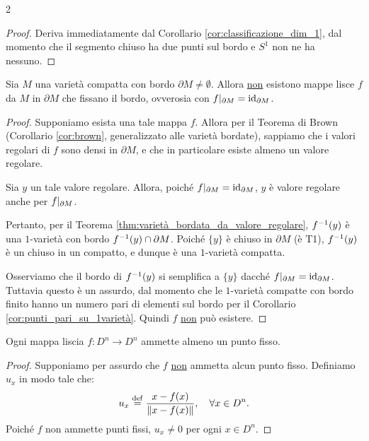 \begin{multicols*}{2}
    \begin{proof}
        Deriva immediatamente dal Corollario \ref{cor:classificazione_dim_1}, dal momento che
        il segmento chiuso ha due punti sul bordo e $S^1$ non ne ha nessuno.
    \end{proof}

    \begin{lemma} \label{lem:non_retrazione}
        Sia $M$ una varietà compatta con bordo $\partial M \neq \emptyset$. Allora \underline{non}
        esistono mappe lisce $f$ da $M$ in $\partial M$ che fissano il bordo, ovverosia
        con $f\arrowvert_{\partial M} = \operatorname{id}_{\partial M}$.
    \end{lemma}

    \begin{proof}
        Supponiamo esista una tale mappa $f$. Allora per il Teorema di Brown (Corollario \ref{cor:brown}, generalizzato alle varietà
        bordate), sappiamo che i valori regolari di $f$ sono densi in $\partial M$, e che in particolare
        esiste almeno un valore regolare. \smallskip

        Sia $y$ un
        tale valore regolare. Allora, poiché $f\arrowvert_{\partial M} = \operatorname{id}_{\partial M}$,
        $y$ è valore regolare anche per $f\arrowvert_{\partial M}$. \smallskip

        Pertanto, per il Teorema \ref{thm:varietà_bordata_da_valore_regolare}, $f^{-1}(y)$ è una
        $1$-varietà con bordo $f^{-1}(y) \cap \partial M$. Poiché $\{y\}$ è chiuso in $\partial M$
        (è T1), $f^{-1}(y)$ è un chiuso in un compatto, e dunque è una $1$-varietà compatta. \smallskip

        Osserviamo che il bordo di $f^{-1}(y)$ si semplifica a $\{y\}$ dacché $f\arrowvert_{\partial M} = \operatorname{id}_{\partial M}$. Tuttavia questo
        è un assurdo, dal momento che le $1$-varietà compatte con bordo finito hanno un numero pari di elementi sul
        bordo per il Corollario \ref{cor:punti_pari_su_1varietà}. Quindi $f$ \underline{non} può esistere.
    \end{proof}

    \begin{lemma} \label{lem:punto_fisso_cinf}
        Ogni mappa liscia $f : D^n \to D^n$ ammette almeno un punto fisso.
    \end{lemma}

    \begin{proof}
        Supponiamo per assurdo che $f$ \underline{non} ammetta alcun punto fisso.
        Definiamo $u_x$ in modo tale che:
        \[
            u_x \overset{\mathrm{def}}{=} \frac{x - f(x)}{\left\lVert x - f(x) \right\rVert}, \quad \forall x \in D^n.
        \]
        Poiché $f$ non ammette punti fissi, $u_x \neq 0$ per ogni $x \in D^n$. \smallskip


\end{proof}
\end{multicols*}

